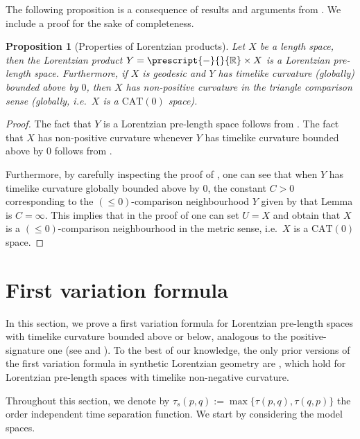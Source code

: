 \documentclass[11pt,reqno]{amsart}
\theoremstyle{definition}
\theoremstyle{definition}
\theoremstyle{plain}
\newtheorem{pop}[dfn]{Proposition}
\theoremstyle{remark}
\begin{document}
The following proposition is a consequence of results and arguments from \cite{alexander-graf-kunzinger-saemann2023}. We include a proof for the sake of completeness.


\begin{pop}[Properties of Lorentzian products]
\label{pop:AGKS-products}
Let $X$ be a length space, then the Lorentzian product $Y=\prescript{-}{}{\mathbb{R}}\times X$ is a Lorentzian pre-length space. Furthermore, if $X$ is geodesic and $Y$ has timelike curvature (globally) bounded above by $0$, then $X$ has non-positive curvature in the triangle comparison sense (globally, i.e.\ $X$ is a $\mathrm{CAT}(0)$ space).
\end{pop}

\begin{proof}
The fact that $Y$ is a Lorentzian pre-length space follows from \cite[Proposition~3.2]{BORS23}.
The fact that $X$ has non-positive curvature whenever $Y$ has timelike curvature bounded above by $0$ follows from \cite[Theorem~5.7]{alexander-graf-kunzinger-saemann2023}.

Furthermore, by carefully inspecting the proof of \cite[Lemma~5.6]{alexander-graf-kunzinger-saemann2023}, one can see that when $Y$ has timelike curvature globally bounded above by $0$, the constant $C>0$ corresponding to the $(\leq 0)$-comparison neighbourhood $Y$ given by that Lemma is $C=\infty$. This implies that in the proof of \cite[Theorem~5.7]{alexander-graf-kunzinger-saemann2023} one can set $U=X$ and obtain that $X$ is a $(\leq 0)$-comparison neighbourhood in the metric sense, i.e.\ $X$ is a $\mathrm{CAT}(0)$ space. 
\end{proof}

\section{First variation formula}

In this section, we prove a first variation formula for Lorentzian pre-length spaces with timelike curvature bounded above or below, analogous to the positive-signature one (see \cite[Theorem~4.5.6]{burago-burago-ivanov2001} and \cite[Theorem~3.5]{otsu-shioya1994}). To the best of our knowledge, the only prior versions of the first variation formula in synthetic Lorentzian geometry are \cite[Theorems~19 and 20]{BarreraMontesdeOcaSolis2022}, which hold for Lorentzian pre-length spaces with timelike non-negative curvature.  

Throughout this section, we denote by $\tau_s(p,q):=\max\{\tau(p,q),\tau(q,p)\}$ the order independent time separation function.
We start by considering the model spaces.
\end{document}
